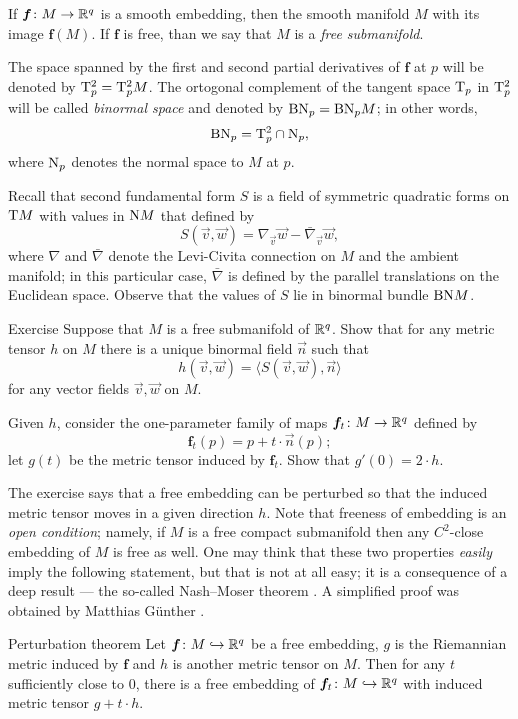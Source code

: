 If $\bm{f}\colon M\to \mathbb{R}^q$ is a smooth embedding, then the smooth manifold $M$ with its image $\bm{f}(M)$.
If $\bm{f}$ is free, than we say that $M$ is a \emph{free submanifold}.

The space spanned by the first and second partial derivatives of $\bm{f}$ at $p$ will be denoted by $\mathrm{T}^2_p=\mathrm{T}^2_pM$.
The ortogonal complement of the tangent space $\mathrm{T}_p$ in $\mathrm{T}^2_p$ will be called \emph{binormal space} and denoted by $\mathrm{BN}_p=\mathrm{BN}_pM$; in other words,
\[\mathrm{BN}_p=\mathrm{T}^2_p\cap\mathrm{N}_p,\]
where $\mathrm{N}_p$ denotes the normal space to $M$ at $p$.

Recall that second fundamental form $S$ is a field of symmetric quadratic forms on $\mathrm{T} M$  with values in $\mathrm{N} M$ that defined by 
\[S(\vec v,\vec w)=\nabla_{\vec v}\vec w-\bar\nabla_{\vec v}\vec w,\]
where $\nabla$ and $\bar \nabla$ denote the Levi-Civita connection on $M$ and the ambient manifold;
in this particular case, $\bar \nabla$ is defined by the parallel translations on the Euclidean space.
Observe that the values of $S$ lie in binormal bundle $\mathrm{BN} M$.

\begin{thm}{Exercise}\label{ex:binormal}
Suppose that $M$ is a free submanifold of $\mathbb{R}^q$.
Show that for any metric tensor $h$ on $M$ there is a unique binormal field $\vec n$ such  that 
\[h(\vec v,\vec w)=\langle S(\vec v,\vec w),\vec n\rangle\]
for any vector fields $\vec v,\vec w$ on $M$.

Given $h$, consider the one-parameter family of maps $\bm{f}_t\colon M\to \mathbb{R}^q$ defined by 
\[\bm{f}_t(p)= p+t\cdot \vec n(p);\]
let $g(t)$ be the metric tensor induced by $\bm{f}_t$.
Show that $g'(0)=2\cdot h$.
\end{thm}

The exercise says that a free embedding can be perturbed so that the induced metric tensor moves in a given direction $h$.
Note that freeness of embedding is an \emph{open condition};
namely, if $M$ is a free compact submanifold then any $C^2$-close embedding of $M$ is free as well.
One may think that these two properties \emph{easily} imply the following statement,
but that is not at all easy;
it is a consequence of a deep result --- the so-called Nash--Moser theorem \cite{moser-1961}.
A simplified proof was obtained by Matthias G\"{u}nther \cite{gunter}.

\begin{thm}{Perturbation theorem}\label{thm:perturbation}
Let $\bm{f}\colon M\hookrightarrow\mathbb{R}^q$ be a free embedding, $g$ is the Riemannian metric induced by $\bm{f}$ and $h$ is another metric tensor on $M$.
Then for any $t$ sufficiently close to $0$, there is a free embedding of $\bm{f}_t\colon M\hookrightarrow\mathbb{R}^q$ with  induced metric tensor $g+t\cdot h$.  
\end{thm}

